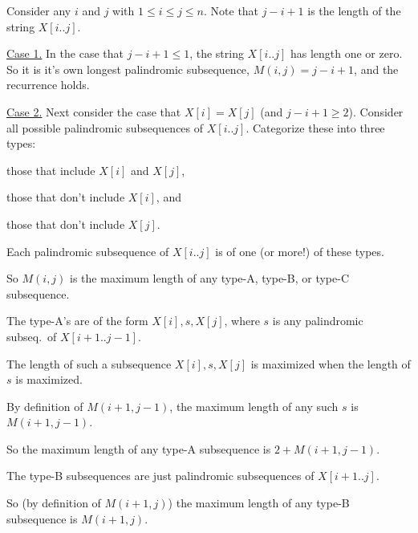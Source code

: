 \begin{longFormProof}%
  \step Consider any $i$ and $j$ with $1\le i\le j\le n$.  Note that $j-i+1$ is the length of the string $X[i..j]$.

  \smallskip 
  \begin{block}
    \step \underline{Case 1.} In the case that $j-i+1\le 1$, the string $X[i..j]$ has length one or zero.
    \step So it is it's own longest palindromic subsequence, $M(i, j)=j-i+1$, and the recurrence holds.
  \end{block}

  \smallskip 
  \begin{block}
    \step \underline{Case 2.} Next consider the case that $X[i]=X[j]$ (and $j-i+1\ge 2$).
    \step Consider all possible palindromic subsequences of $X[i..j]$.
    \step Categorize these into three types:
    \begin{mylist}
    \item[(A)] those that include $X[i]$ and $X[j]$,
    \item[(B)] those that don't include $X[i]$, and
    \item[(C)] those that don't include $X[j]$.
    \end{mylist}

    \step Each palindromic subsequence of $X[i..j]$ is of  one (or more!) of these types.

    \step\label{dp: step: A or B or C} So $M(i, j)$ is the maximum length of any type-A, type-B, or type-C subsequence.

    \smallskip 
    
    \step The type-A's are of the form $X[i], s, X[j]$,
    where $s$ is any palindromic subseq.~of $X[i+1..j-1]$.

    \step The length of such a subsequence $X[i], s, X[j]$ is maximized when the length of $s$ is maximized.

    \step By definition of $M(i+1,j-1)$, the maximum length of any such $s$ is $M(i+1, j-1)$.

    \step\label{dp: step: palindrome A}
    So the maximum length of any type-A subsequence is $2+M(i+1, j-1)$.

    \smallskip
    
    \step The type-B subsequences are just palindromic subsequences of $X[i+1..j]$.

    \step\label{dp: step: palindrome B}
    So (by definition of $M(i+1,j)$) the maximum length of any type-B subsequence is $M(i+1, j)$.


\end{block}
\end{longFormProof}
